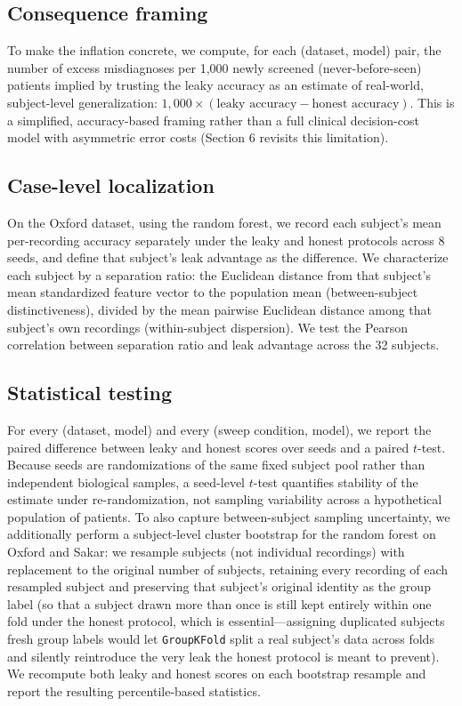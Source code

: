 \documentclass[11pt]{article}
\begin{document}
\subsection{Consequence framing}
To make the inflation concrete, we compute, for each (dataset, model) pair, the number of excess misdiagnoses per 1,000 newly screened (never-before-seen) patients implied by trusting the leaky accuracy as an estimate of real-world, subject-level generalization: $1{,}000 \times (\text{leaky accuracy} - \text{honest accuracy})$. This is a simplified, accuracy-based framing rather than a full clinical decision-cost model with asymmetric error costs (Section 6 revisits this limitation).

\subsection{Case-level localization}
On the Oxford dataset, using the random forest, we record each subject's mean per-recording accuracy separately under the leaky and honest protocols across 8 seeds, and define that subject's leak advantage as the difference. We characterize each subject by a separation ratio: the Euclidean distance from that subject's mean standardized feature vector to the population mean (between-subject distinctiveness), divided by the mean pairwise Euclidean distance among that subject's own recordings (within-subject dispersion). We test the Pearson correlation between separation ratio and leak advantage across the 32 subjects.

\subsection{Statistical testing}
For every (dataset, model) and every (sweep condition, model), we report the paired difference between leaky and honest scores over seeds and a paired $t$-test. Because seeds are randomizations of the same fixed subject pool rather than independent biological samples, a seed-level $t$-test quantifies stability of the estimate under re-randomization, not sampling variability across a hypothetical population of patients. To also capture between-subject sampling uncertainty, we additionally perform a subject-level cluster bootstrap for the random forest on Oxford and Sakar: we resample subjects (not individual recordings) with replacement to the original number of subjects, retaining every recording of each resampled subject and preserving that subject's original identity as the group label (so that a subject drawn more than once is still kept entirely within one fold under the honest protocol, which is essential---assigning duplicated subjects fresh group labels would let \texttt{GroupKFold} split a real subject's data across folds and silently reintroduce the very leak the honest protocol is meant to prevent). We recompute both leaky and honest scores on each bootstrap resample and report the resulting percentile-based statistics.
\end{document}
